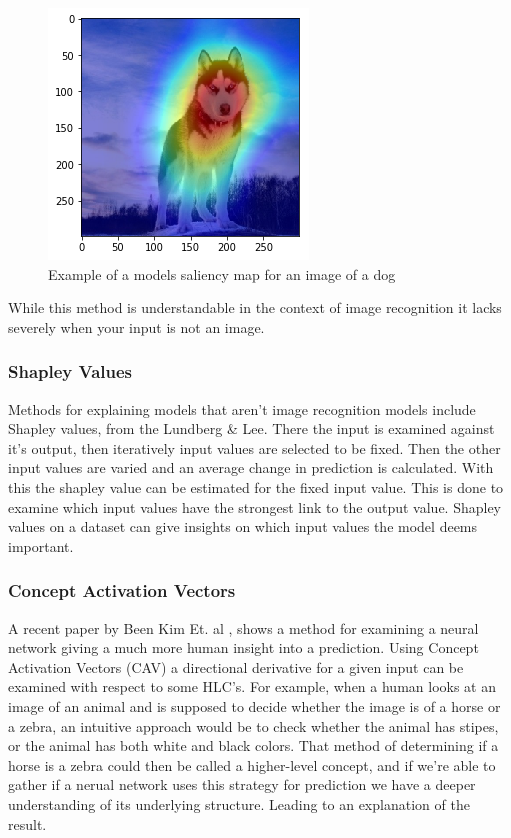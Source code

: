 \begin{figure}[]
  \centering
  \includegraphics[width=.5\textwidth]{graphics/dog_saliency}
  \caption{Example of a models saliency map for an image of a dog}
  \label{fig:dog_saliency}
\end{figure}

While this method is understandable in the context of image recognition it
lacks severely when your input is not an image.

\subsubsection{Shapley Values}

Methods for explaining models that aren't image recognition models include
Shapley values, from the Lundberg \& Lee\cite{LundbergL:shapley}. There the input is examined against it's output, then iteratively
input values are selected to be fixed. Then the other input values are varied and
an average change in prediction is calculated. With this the shapley value can be
estimated for the fixed input value. This is done to examine which input values have
the strongest link to the output value. Shapley values on a dataset can give insights
on which input values the model deems important.

\subsubsection{Concept Activation Vectors}

A recent paper by Been Kim Et. al \cite{Keem:TCAV}, shows a method for examining
a neural network giving a much more human insight into a prediction. Using Concept
Activation Vectors (CAV) a directional derivative for a given input can be examined
with respect to some HLC's. For example, when a human looks at an image of an animal
and is supposed to decide whether the image is of a horse or a zebra, an intuitive
approach would be to check whether the animal has stipes, or the animal has both white and black colors.
That method of determining if a horse is a zebra could then be called a higher-level
concept, and if we're able to gather if a nerual network uses this strategy for prediction
we have a deeper understanding of its underlying structure. Leading to an explanation of
the result.

